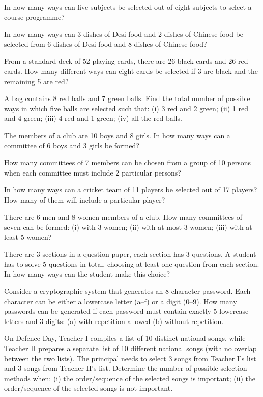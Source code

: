 \documentclass[11pt,a4paper]{article}
\begin{document}
\begin{longlist}
\item In how many ways can five subjects be selected out of eight subjects to select a course programme?

\item In how many ways can 3 dishes of Desi food and 2 dishes of Chinese food be selected from 6 dishes of Desi food and 8 dishes of Chinese food?

\item From a standard deck of 52 playing cards, there are 26 black cards and 26 red cards. How many different ways can eight cards be selected if 3 are black and the remaining 5 are red?

\item A bag contains 8 red balls and 7 green balls. Find the total number of possible ways in which five balls are selected such that: (i) 3 red and 2 green; (ii) 1 red and 4 green; (iii) 4 red and 1 green; (iv) all the red balls.

\item The members of a club are 10 boys and 8 girls. In how many ways can a committee of 6 boys and 3 girls be formed?

\item How many committees of 7 members can be chosen from a group of 10 persons when each committee must include 2 particular persons?

\item In how many ways can a cricket team of 11 players be selected out of 17 players? How many of them will include a particular player?

\item There are 6 men and 8 women members of a club. How many committees of seven can be formed: (i) with 3 women; (ii) with at most 3 women; (iii) with at least 5 women?

\item There are 3 sections in a question paper, each section has 3 questions. A student has to solve 5 questions in total, choosing at least one question from each section. In how many ways can the student make this choice?

\item Consider a cryptographic system that generates an 8-character password. Each character can be either a lowercase letter (a--f) or a digit (0--9). How many passwords can be generated if each password must contain exactly 5 lowercase letters and 3 digits: (a) with repetition allowed (b) without repetition.

\item On Defence Day, Teacher I compiles a list of 10 distinct national songs, while Teacher II prepares a separate list of 10 different national songs (with no overlap between the two lists). The principal needs to select 3 songs from Teacher I's list and 3 songs from Teacher II's list. Determine the number of possible selection methods when: (i) the order/sequence of the selected songs is important; (ii) the order/sequence of the selected songs is not important.


\end{longlist}
\end{document}
